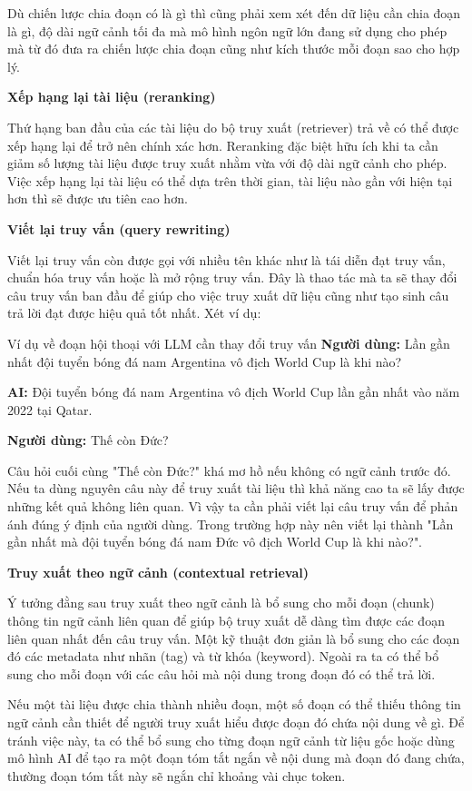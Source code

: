 Dù chiến lược chia đoạn có là gì thì cũng phải xem xét đến dữ liệu cần chia đoạn là gì, độ dài ngữ cảnh tối đa mà mô hình ngôn ngữ lớn đang sử dụng cho phép mà từ đó đưa ra chiến lược chia đoạn cũng như kích thước mỗi đoạn sao cho hợp lý.

\vspace{1em}
\textbf{Xếp hạng lại tài liệu (reranking)}

Thứ hạng ban đầu của các tài liệu do bộ truy xuất (retriever) trả về có thể được xếp hạng lại để trở nên chính xác hơn. Reranking đặc biệt hữu ích khi ta cần giảm số lượng tài liệu được truy xuất nhằm vừa với độ dài ngữ cảnh cho phép. Việc xếp hạng lại tài liệu có thể dựa trên thời gian, tài liệu nào gần với hiện tại hơn thì sẽ được ưu tiên cao hơn.

\vspace{1em}
\textbf{Viết lại truy vấn (query rewriting)}

Viết lại truy vấn còn được gọi với nhiều tên khác như là tái diễn đạt truy vấn, chuẩn hóa truy vấn hoặc là mở rộng truy vấn. Đây là thao tác mà ta sẽ thay đổi câu truy vấn ban đầu để giúp cho việc truy xuất dữ liệu cũng như tạo sinh câu trả lời đạt được hiệu quả tốt nhất. Xét ví dụ: 
\begin{promptbox}{Ví dụ về đoạn hội thoại với LLM cần thay đổi truy vấn}
\textbf{Người dùng:}
Lần gần nhất đội tuyển bóng đá nam Argentina vô địch World Cup là khi nào?

\textbf{AI:} Đội tuyển bóng đá nam Argentina vô địch World Cup lần gần nhất vào năm 2022 tại Qatar.

\textbf{Người dùng:} Thế còn Đức?
\end{promptbox}

Câu hỏi cuối cùng "Thế còn Đức?" khá mơ hồ nếu không có ngữ cảnh trước đó. Nếu ta dùng nguyên câu này để truy xuất tài liệu thì khả năng cao ta sẽ lấy được những kết quả không liên quan. Vì vậy ta cần phải viết lại câu truy vấn để phản ánh đúng ý định của người dùng. Trong trường hợp này nên viết lại thành "Lần gần nhất mà đội tuyển bóng đá nam Đức vô địch World Cup là khi nào?".

\vspace{1em}
\textbf{Truy xuất theo ngữ cảnh (contextual retrieval)}

Ý tưởng đằng sau truy xuất theo ngữ cảnh là bổ sung cho mỗi đoạn (chunk) thông tin ngữ cảnh liên quan để giúp bộ truy xuất dễ dàng tìm được các đoạn liên quan nhất đến câu truy vấn. Một kỹ thuật đơn giản là bổ sung cho các đoạn đó các metadata như nhãn (tag) và từ khóa (keyword). Ngoài ra ta có thể bổ sung cho mỗi đoạn với các câu hỏi mà nội dung trong đoạn đó có thể trả lời. 

Nếu một tài liệu được chia thành nhiều đoạn, một số đoạn có thể thiếu thông tin ngữ cảnh cần thiết để người truy xuất hiểu được đoạn đó chứa nội dung về gì. Để tránh việc này, ta có thể bổ sung cho từng đoạn ngữ cảnh từ liệu gốc hoặc dùng mô hình AI để tạo ra một đoạn tóm tắt ngắn về nội dung mà đoạn đó đang chứa, thường đoạn tóm tắt này sẽ ngắn chỉ khoảng vài chục token.